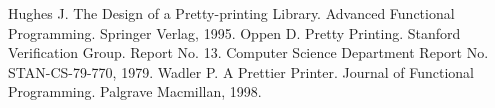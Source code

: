 % 
% 

\begin{thebibliography}{99}
 Hughes J. The Design of a Pretty-printing Library. Advanced Functional Programming. Springer Verlag, 1995.
 Oppen D. Pretty Printing. Stanford Verification Group. Report No. 13. Computer Science Department Report No. STAN-CS-79-770, 1979.
 Wadler P. A Prettier Printer. Journal of Functional Programming. Palgrave Macmillan, 1998.
\end{thebibliography}
